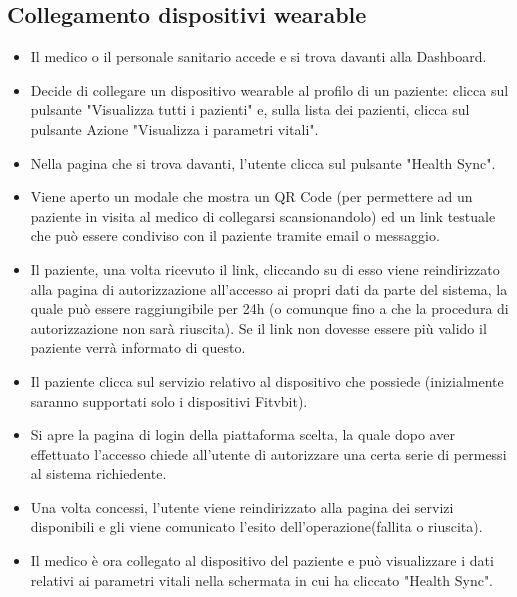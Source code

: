 \documentclass[12pt,a4paper,oneside]{report}
\begin{document}
\subsection{Collegamento dispositivi wearable}
\begin{itemize}
    \item Il medico o il personale sanitario accede e si trova davanti alla Dashboard.
    \item Decide di collegare un dispositivo wearable al profilo di un paziente: clicca sul pulsante "Visualizza tutti i pazienti" e, sulla lista dei pazienti, clicca sul pulsante Azione "Visualizza i parametri vitali".
    \item Nella pagina che si trova davanti, l'utente clicca sul pulsante "Health Sync".
    \item Viene aperto un modale che mostra un QR Code (per permettere ad un paziente in visita al medico di collegarsi scansionandolo) ed un link testuale che può essere condiviso con il paziente tramite email o messaggio.
    \item Il paziente, una volta ricevuto il link, cliccando su di esso viene reindirizzato alla pagina di autorizzazione all'accesso ai propri dati da parte del sistema, la quale può essere raggiungibile per 24h (o comunque fino a che la procedura di autorizzazione non sarà riuscita). Se il link non dovesse essere più valido il paziente verrà informato di questo.
    \item Il paziente clicca sul servizio relativo al dispositivo che possiede (inizialmente saranno supportati solo i dispositivi Fitvbit).
    \item Si apre la pagina di login della piattaforma scelta, la quale dopo aver effettuato l'accesso chiede all'utente di autorizzare una certa serie di permessi al sistema richiedente.
    \item Una volta concessi, l'utente viene reindirizzato alla pagina dei servizi disponibili e gli viene comunicato l'esito dell'operazione(fallita o riuscita).
    \item Il medico è ora collegato al dispositivo del paziente e può visualizzare i dati relativi ai parametri vitali nella schermata in cui ha cliccato "Health Sync".
\end{itemize}
\end{document}
